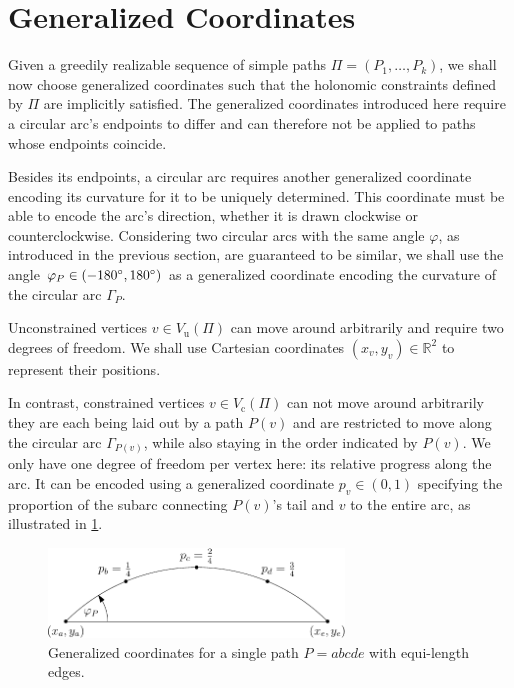 \section{Generalized Coordinates}
\label{sect:generalized-coordinates}

Given a greedily realizable sequence of simple paths ${\Pi = (P_1, \ldots, P_k)}$, we shall now choose generalized coordinates such that the holonomic constraints defined by ${\Pi}$ are implicitly satisfied. The generalized coordinates introduced here require a circular arc's endpoints to differ and can therefore not be applied to paths whose endpoints coincide.

\hfill

\noindent
Besides its endpoints, a circular arc requires another generalized coordinate encoding its curvature for it to be uniquely determined. This coordinate must be able to encode the arc's direction, \ie{} whether it is drawn clockwise or counterclockwise. Considering two circular arcs with the same angle $\varphi$, as introduced in the previous section, are guaranteed to be similar, we shall use the angle ${\varphi_P \in (-180 ^{\circ}, 180 ^{\circ})}$ as a generalized coordinate encoding the curvature of the circular arc ${\Gamma_P}$.

Unconstrained vertices ${v \in V_\text{u}(\Pi)}$ can move around arbitrarily and require two degrees of freedom. We shall use Cartesian coordinates ${(x_v, y_v) \in \mathbb{R}^2}$ to represent their positions.

In contrast, constrained vertices ${v \in V_\text{c}(\Pi)}$ can not move around arbitrarily \emdash they are each being laid out by a path ${P(v)}$ and are restricted to move along the circular arc ${\Gamma_{P(v)}}$, while also staying in the order indicated by ${P(v)}$. We only have one degree of freedom per vertex here: its relative progress along the arc. It can be encoded using a generalized coordinate ${p_v \in (0, 1)}$ specifying the proportion of the subarc connecting ${P(v)}$'s tail and ${v}$ to the entire arc, as illustrated in \cref{fig:generalized-coordinates-for-single-path}.



\hfill
\begin{figure}[H]
  \centering\includegraphics[width=0.7\textwidth]{Resources/Figures/Generalized-Coordinates-Example.pdf}
  \caption{Generalized coordinates for a single path ${P = abcde}$ with equi-length edges.}
  \label{fig:generalized-coordinates-for-single-path}
\end{figure}
\clearpage



